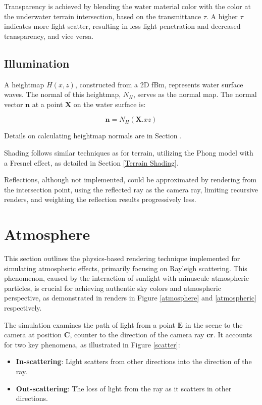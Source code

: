 Transparency is achieved by blending the water material color with the color at the underwater terrain intersection, based on the transmittance $\tau$. A higher $\tau$ indicates more light scatter, resulting in less light penetration and decreased transparency, and vice versa.

\subsection{Illumination}
\label{Water Shading}

A heightmap $H(x,z)$, constructed from a 2D fBm, represents water surface waves. The normal of this heightmap, $N_H$, serves as the normal map. The normal vector $\mathbf{n}$ at a point $\mathbf{X}$ on the water surface is:

\begin{equation}
\mathbf{n}= N_{H}(\mathbf{X}.xz)
\end{equation}

Details on calculating heightmap normals are in Section .

Shading follows similar techniques as for terrain, utilizing the Phong model with a Fresnel effect, as detailed in Section \ref{Terrain Shading}. 

Reflections, although not implemented, could be approximated by rendering from the intersection point, using the reflected ray as the camera ray, limiting recursive renders, and weighting the reflection results progressively less. 

\section{Atmosphere}

This section outlines the physics-based rendering technique implemented for simulating atmospheric effects, primarily focusing on Rayleigh scattering. This phenomenon, caused by the interaction of sunlight with minuscule atmospheric particles, is crucial for achieving authentic sky colors and atmospheric perspective, as demonstrated in renders in Figure \ref{atmosphere}  and \ref{atmospheric} respectively.

The simulation examines the path of light from a point $\mathbf{E}$ in the scene to the camera at position $\mathbf{C}$, counter to the direction of the camera ray $\mathbf{cr}$. It accounts for two key phenomena, as illustrated in Figure \ref{scatter}:
\begin{itemize}
    \item \textbf{In-scattering}: Light scatters from other directions into the direction of the ray.
    \item \textbf{Out-scattering}: The loss of light from the ray as it scatters in other directions.
\end{itemize}

